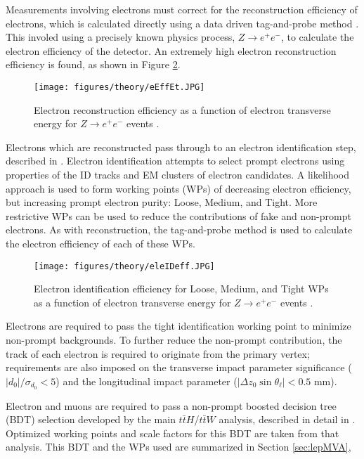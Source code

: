 Measurements involving electrons must correct for the reconstruction efficiency of electrons, which is calculated directly using a data driven tag-and-probe method \cite{tagAndProbe}. This involed using a precisely known physics process, $Z\rightarrow e^+e^-$, to calculate the electron efficiency of the detector. An extremely high electron reconstruction efficiency is found, as shown in Figure \ref{fig:eEffEt}.

\begin{figure}[H]
\centering
   \texttt{[image: figures/theory/eEffEt.JPG]}
\caption{Electron reconstruction efficiency as a function of electron transverse energy for $Z\rightarrow e^+e^-$ events \cite{tagAndProbe}.}
\label{fig:eEffEt}
\end{figure}

Electrons which are reconstructed pass through to an electron identification step, described in \cite{tagAndProbe}. Electron identification attempts to select prompt electrons using properties of the ID tracks and EM clusters of electron candidates.  A likelihood approach is used to form working points (WPs) of decreasing electron efficiency, but increasing prompt electron purity: Loose, Medium, and Tight. More restrictive WPs can be used to reduce the contributions of fake and non-prompt electrons. As with reconstruction, the tag-and-probe method is used to calculate the electron efficiency of each of these WPs. 

\begin{figure}[H]
\centering
   \texttt{[image: figures/theory/eleIDeff.JPG]}
\caption{Electron identification efficiency for Loose, Medium, and Tight WPs as a function of electron transverse energy for $Z\rightarrow e^+e^-$ events \cite{tagAndProbe}.}
\label{fig:eEffEt}
\end{figure}

Electrons are required to pass the tight identification working point to minimize non-prompt backgrounds. To further reduce the non-prompt contribution, the track of each electron is required to originate from the primary vertex; requirements are also imposed on the transverse impact parameter significance ($|d_0|/\sigma_{d_0}<5$) and the longitudinal impact parameter ($|\Delta z_0 \sin \theta_\ell|<0.5$ mm).

Electron and muons are required to pass a non-prompt boosted decision tree (BDT) selection developed by the main $t\bar{t}H$/$t\bar{t}W$ analysis, described in detail in \cite{ttH_paper}. Optimized working points and scale factors for this BDT are taken from that analysis. This BDT and the WPs used are summarized in Section \ref{sec:lepMVA},

